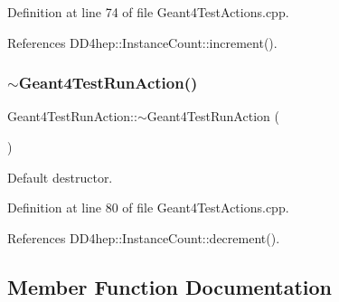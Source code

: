 Definition at line 74 of file Geant4\+Test\+Actions.\+cpp.



References D\+D4hep\+::\+Instance\+Count\+::increment().

\hypertarget{class_d_d4hep_1_1_simulation_1_1_test_1_1_geant4_test_run_action_a6ce0a9785be8b5d86be20d2bc5a3db64}{}\label{class_d_d4hep_1_1_simulation_1_1_test_1_1_geant4_test_run_action_a6ce0a9785be8b5d86be20d2bc5a3db64} 
\subsubsection{\texorpdfstring{$\sim$\+Geant4\+Test\+Run\+Action()}{~Geant4TestRunAction()}}
{\footnotesize\ttfamily Geant4\+Test\+Run\+Action\+::$\sim$\+Geant4\+Test\+Run\+Action (\begin{DoxyParamCaption}{ }\end{DoxyParamCaption})\hspace{0.3cm}{\ttfamily [virtual]}}



Default destructor. 



Definition at line 80 of file Geant4\+Test\+Actions.\+cpp.



References D\+D4hep\+::\+Instance\+Count\+::decrement().



\subsection{Member Function Documentation}
\hypertarget{class_d_d4hep_1_1_simulation_1_1_test_1_1_geant4_test_run_action_a1df121c6a80d42e72c898e7303d5c64e}{}\label{class_d_d4hep_1_1_simulation_1_1_test_1_1_geant4_test_run_action_a1df121c6a80d42e72c898e7303d5c64e} 
